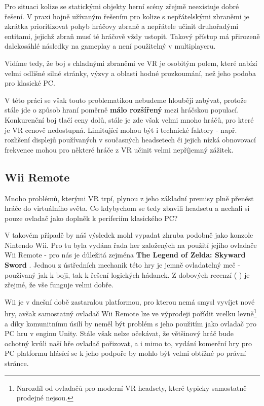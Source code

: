 Pro situaci kolize se statickými objekty herní scény zřejmě neexistuje dobré řešení. V praxi hojně užívaným řešením pro kolize s nepřátelskými zbraněmi je zkrátka prioritizovat pohyb hráčovy zbraně a nepřátele učinit druhořadými entitami, jejichž zbraň musí té hráčově vždy ustopit. Takový přístup má přirozeně dalekosáhlé následky na gameplay a není použitelný v multiplayeru. 

Vidíme tedy, že boj s chladnými zbraněmi ve \acs{VR} je osobitým polem, které nabízí velmi odlišné silné stránky, výzvy a oblasti hodné prozkoumání, než jeho podoba pro klasické PC.

V této práci se však touto problematikou nebudeme hlouběji zabývat, protože stále jde o způsob hraní poměrně \textbf{málo rozšířený} mezi hráčskou populací. Konkurenční boj tlačí ceny dolů, stále je zde však velmi mnoho hráčů, pro které je \acs{VR} cenově nedostupná. Limitující mohou být i technické faktory - např. rozlišení displejů používaných v současných headsetech či jejich nízká obnovovací frekvence mohou pro některé hráče z \acs{VR} učinit velmi nepříjemný zážitek. 

\subsection{Wii Remote}

Mnoho problémů, kterými \acs{VR} trpí, plynou z jeho základní premisy plně přenést hráče do virtuálního světa. Co kdybychom se tedy zbavili headsetu a nechali si pouze ovladač jako doplněk k periferiím klasického PC?

V takovém případě by náš výsledek mohl vypadat zhruba podobně jako konzole Nintendo Wii. Pro tu byla vydána řada her založených na použití jejího ovladače Wii Remote - pro nás je důležitá zejména \textbf{The Legend of Zelda: Skyward Sword} \cite{ZeldaSkywardSword}. Jednou z ústředních mechanik této hry je jemně ovladatelný meč - používaný jak k boji, tak k řešení logických hádanek. Z dobových recenzí (\cite{SkywardReviewNintendolife} \cite{SkywardReviewIgn}) je zřejmé, že vše funguje velmi dobře. 

Wii je v dnešní době zastaralou platformou, pro kterou nemá smysl vyvíjet nové hry, avšak samostatný ovladač Wii Remote lze ve výprodeji pořídit vcelku levně\footnote{Narozdíl od ovladačů pro moderní \acs{VR} headsety, které typicky samostatně prodejné nejsou.} a díky komunitnímu úsilí \cite{WiiRemoteUnityAPI} by neměl být problém s jeho použitím jako ovladač pro PC hru v enginu Unity. Stále však nelze očekávat, že většinový hráč bude ochotný kvůli naší hře ovladač pořizovat, a i mimo to, vydání komerční hry pro PC platformu hlásící se k jeho podpoře by mohlo být velmi obtížné po právní stránce.

